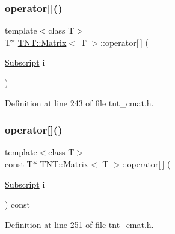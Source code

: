 \mbox{\label{classTNT_1_1Matrix_acc34b4e329cdb08e7cd2ee6cd4aa0aac}} 
\subsubsection{\texorpdfstring{operator[]()}{operator[]()}\hspace{0.1cm}{\footnotesize\ttfamily [1/2]}}
{\footnotesize\ttfamily template$<$class T$>$ \\
T$\ast$ \hyperlink{classTNT_1_1Matrix}{T\+N\+T\+::\+Matrix}$<$ T $>$\+::operator\mbox{[}$\,$\mbox{]} (\begin{DoxyParamCaption}\item[{\hyperlink{namespaceTNT_af22e3f1460e145c04ce4e7d701e4c1c1}{Subscript}}]{i }\end{DoxyParamCaption})\hspace{0.3cm}{\ttfamily [inline]}}



Definition at line 243 of file tnt\+\_\+cmat.\+h.

\mbox{\label{classTNT_1_1Matrix_a44070f0a8bcdff483058f63f099f6697}} 
\subsubsection{\texorpdfstring{operator[]()}{operator[]()}\hspace{0.1cm}{\footnotesize\ttfamily [2/2]}}
{\footnotesize\ttfamily template$<$class T$>$ \\
const T$\ast$ \hyperlink{classTNT_1_1Matrix}{T\+N\+T\+::\+Matrix}$<$ T $>$\+::operator\mbox{[}$\,$\mbox{]} (\begin{DoxyParamCaption}\item[{\hyperlink{namespaceTNT_af22e3f1460e145c04ce4e7d701e4c1c1}{Subscript}}]{i }\end{DoxyParamCaption}) const\hspace{0.3cm}{\ttfamily [inline]}}



Definition at line 251 of file tnt\+\_\+cmat.\+h.

